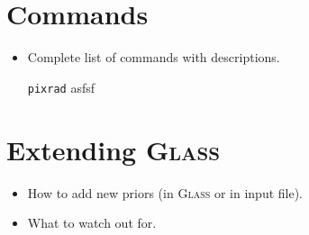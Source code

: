 \documentclass[a4paper]{report}
\newcommand{\glass}{\textsc{Glass}\xspace}
\newcommand{\glcmd}[1]{\texttt{#1}\xspace}
\begin{document}
\chapter{Commands}
\begin{itemize}
\item Complete list of commands with descriptions.
\end{itemize}

\begin{itemize}
\item[\glcmd{pixrad}] asfsf
\end{itemize}

\chapter{Extending \glass}
\begin{itemize}
\item How to add new priors (in \glass or in input file).
\item What to watch out for.
\end{itemize}



\end{document}
